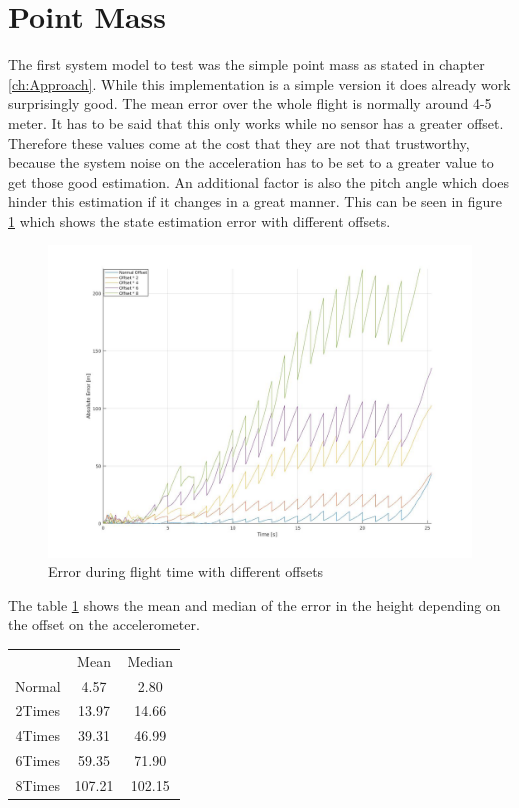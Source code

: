 \section{Point Mass}
The first system model to test was the simple point mass as stated in chapter \ref{ch:Approach}.
While this implementation is a simple version it does already work surprisingly good.
The mean error over the whole flight is normally around 4-5 meter.
It has to be said that this only works while no sensor has a greater offset.
Therefore these values come at the cost that they are not that trustworthy, 
because the system noise on the acceleration has to be set to a greater value to get those good estimation.
An additional factor is also the pitch angle which does hinder this estimation if it changes in a great manner.
This can be seen in figure \ref{fig:PointMassErrorWithOffset} which shows the state estimation error with different offsets.

\begin{figure}[h!]
 \centering
 \includegraphics[width=.8\textwidth]{./Pictures/PointMassErrorWithOffset.jpg}
 \caption{Error during flight time with different offsets}
 \label{fig:PointMassErrorWithOffset}
\end{figure}


The table \ref{tab:PointMassPerformanceWithOffset} shows the mean and median of the error in the height depending on the offset on the accelerometer.

\begin{table}
\begin{center}
\begin{tabular}{ccc}
& Mean & Median\\
Normal & 4.57 & 2.80\\
2Times & 13.97 & 14.66\\
4Times & 39.31 & 46.99\\
6Times & 59.35 & 71.90\\
8Times & 107.21 & 102.15
\end{tabular}
\end{center}
\label{tab:PointMassPerformanceWithOffset}
\end{table}

